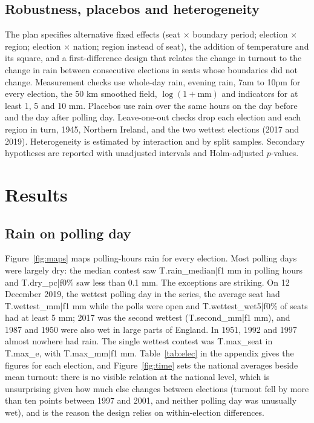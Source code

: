 \documentclass[11pt,a4paper]{article}
\begin{document}
\subsection{Robustness, placebos and heterogeneity}
The plan specifies alternative fixed effects (seat $\times$ boundary period; election $\times$ region; election $\times$ nation; region instead of seat), the addition of temperature and its square, and a first-difference design that relates the change in turnout to the change in rain between consecutive elections in seats whose boundaries did not change. Measurement checks use whole-day rain, evening rain, 7am to 10pm for every election, the 50 km smoothed field, $\log(1+\text{mm})$ and indicators for at least 1, 5 and 10 mm. Placebos use rain over the same hours on the day before and the day after polling day. Leave-one-out checks drop each election and each region in turn, 1945, Northern Ireland, and the two wettest elections (2017 and 2019). Heterogeneity is estimated by interaction and by split samples. Secondary hypotheses are reported with unadjusted intervals and Holm-adjusted $p$-values.

\section{Results}\label{sec:results}
\subsection{Rain on polling day}
Figure~\ref{fig:maps} maps polling-hours rain for every election. Most polling days were largely dry: the median contest saw {{T.rain_median|f1}} mm in polling hours and {{T.dry_pc|f0}}\% saw less than 0.1 mm. The exceptions are striking. On 12 December 2019, the wettest polling day in the series, the average seat had {{T.wettest_mm|f1}} mm while the polls were open and {{T.wettest_wet5|f0}}\% of seats had at least 5 mm; 2017 was the second wettest ({{T.second_mm|f1}} mm), and 1987 and 1950 were also wet in large parts of England. In 1951, 1992 and 1997 almost nowhere had rain. The single wettest contest was {{T.max_seat}} in {{T.max_e}}, with {{T.max_mm|f1}} mm. Table~\ref{tab:elec} in the appendix gives the figures for each election, and Figure~\ref{fig:time} sets the national averages beside mean turnout: there is no visible relation at the national level, which is unsurprising given how much else changes between elections (turnout fell by more than ten points between 1997 and 2001, and neither polling day was unusually wet), and is the reason the design relies on within-election differences.
\end{document}
